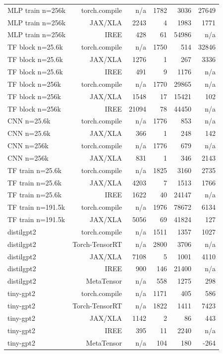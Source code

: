 \begin{tabular}{lrrrrr}
MLP train n=256k & torch.compile & n/a & 1782 & 3036 & 27649 \\
MLP train n=256k & JAX/XLA & 2243 & 4 & 1983 & 1771 \\
MLP train n=256k & IREE & 428 & 61 & 54986 & n/a \\
TF block n=25.6k & torch.compile & n/a & 1750 & 514 & 32846 \\
TF block n=25.6k & JAX/XLA & 1276 & 1 & 267 & 3336 \\
TF block n=25.6k & IREE & 491 & 9 & 1176 & n/a \\
TF block n=256k & torch.compile & n/a & 1770 & 29865 & n/a \\
TF block n=256k & JAX/XLA & 1548 & 17 & 15421 & 102 \\
TF block n=256k & IREE & 21094 & 78 & 44450 & n/a \\
CNN n=25.6k & torch.compile & n/a & 1776 & 853 & n/a \\
CNN n=25.6k & JAX/XLA & 366 & 1 & 248 & 142 \\
CNN n=256k & torch.compile & n/a & 1776 & 679 & n/a \\
CNN n=256k & JAX/XLA & 831 & 1 & 346 & 2143 \\
TF train n=25.6k & torch.compile & n/a & 1825 & 3160 & 2735 \\
TF train n=25.6k & JAX/XLA & 4203 & 7 & 1513 & 1766 \\
TF train n=25.6k & IREE & 1622 & 40 & 24147 & n/a \\
TF train n=191.5k & torch.compile & n/a & 1976 & 78672 & 6134 \\
TF train n=191.5k & JAX/XLA & 5056 & 69 & 41824 & 127 \\
distilgpt2 & torch.compile & n/a & 1511 & 1357 & 1027 \\
distilgpt2 & Torch-TensorRT & n/a & 2800 & 3706 & n/a \\
distilgpt2 & JAX/XLA & 7108 & 5 & 1001 & 4110 \\
distilgpt2 & IREE & 900 & 146 & 21400 & n/a \\
distilgpt2 & MetaTensor & n/a & 558 & 1275 & 298 \\
tiny-gpt2 & torch.compile & n/a & 1171 & 405 & 586 \\
tiny-gpt2 & Torch-TensorRT & n/a & 1822 & 1411 & 7423 \\
tiny-gpt2 & JAX/XLA & 1142 & 2 & 86 & 443 \\
tiny-gpt2 & IREE & 395 & 11 & 2240 & n/a \\
tiny-gpt2 & MetaTensor & n/a & 104 & 180 & -264 \\

\end{tabular}
